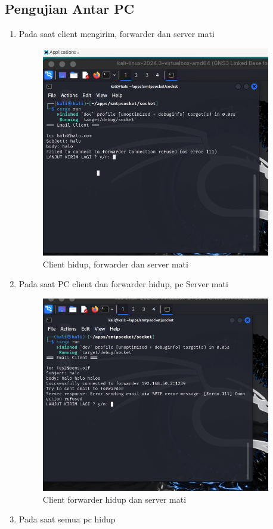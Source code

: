 \documentclass[12pt, a4paper]{article}
\begin{document}
\subsection{Pengujian Antar PC}
\begin{enumerate}
\item Pada saat client mengirim, forwarder dan server mati
\begin{figure}[!ht]
    \centering
    \includegraphics[width=10cm]{bab 3/tes1.png}
    \caption{Client hidup, forwarder dan server mati}
\end{figure}
\item Pada saat PC client dan forwarder hidup, pc Server mati
\begin{figure}[!ht]
    \centering
    \includegraphics[width=10cm]{bab 3/tes2.png}
    \caption{Client forwarder hidup dan server mati}
\end{figure}
\pagebreak
\item Pada saat semua pc hidup 

\end{enumerate}
\end{document}
